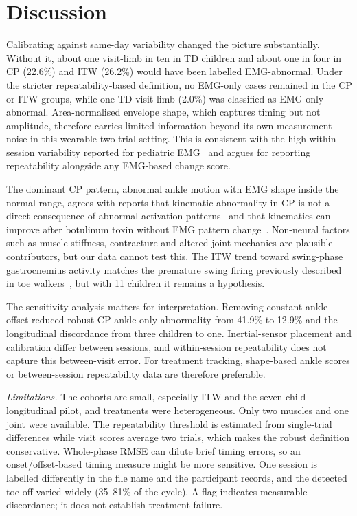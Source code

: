 \documentclass[conference]{IEEEtran}
\begin{document}
\section{Discussion}
Calibrating against same-day variability changed the picture substantially. Without it, about one visit-limb in ten in TD children and about one in four in CP (22.6\%) and ITW (26.2\%) would have been labelled EMG-abnormal. Under the stricter repeatability-based definition, no EMG-only cases remained in the CP or ITW groups, while one TD visit-limb (2.0\%) was classified as EMG-only abnormal. Area-normalised envelope shape, which captures timing but not amplitude, therefore carries limited information beyond its own measurement noise in this wearable two-trial setting. This is consistent with the high within-session variability reported for pediatric EMG~\cite{granata2005repeat} and argues for reporting repeatability alongside any EMG-based change score.

The dominant CP pattern, abnormal ankle motion with EMG shape inside the normal range, agrees with reports that kinematic abnormality in CP is not a direct consequence of abnormal activation patterns~\cite{syczewska2016emg} and that kinematics can improve after botulinum toxin without EMG pattern change~\cite{vanderhouwen2011btx}. Non-neural factors such as muscle stiffness, contracture and altered joint mechanics are plausible contributors, but our data cannot test this. The ITW trend toward swing-phase gastrocnemius activity matches the premature swing firing previously described in toe walkers~\cite{policy2001itw}, but with 11 children it remains a hypothesis.

The sensitivity analysis matters for interpretation. Removing constant ankle offset reduced robust CP ankle-only abnormality from 41.9\% to 12.9\% and the longitudinal discordance from three children to one. Inertial-sensor placement and calibration differ between sessions, and within-session repeatability does not capture this between-visit error. For treatment tracking, shape-based ankle scores or between-session repeatability data are therefore preferable.

\textit{Limitations.} The cohorts are small, especially ITW and the seven-child longitudinal pilot, and treatments were heterogeneous. Only two muscles and one joint were available. The repeatability threshold is estimated from single-trial differences while visit scores average two trials, which makes the robust definition conservative. Whole-phase RMSE can dilute brief timing errors, so an onset/offset-based timing measure might be more sensitive. One session is labelled differently in the file name and the participant records, and the detected toe-off varied widely (35--81\% of the cycle). A flag indicates measurable discordance; it does not establish treatment failure.
\end{document}
